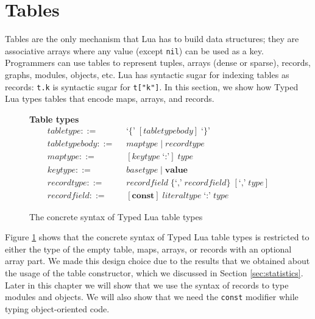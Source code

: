 \section{Tables}
\label{sec:tables}

Tables are the only mechanism that Lua has to build data structures;
they are associative arrays where any value (except \texttt{nil})
can be used as a key.
Programmers can use tables to represent tuples, arrays (dense or sparse),
records, graphs, modules, objects, etc.
Lua has syntactic sugar for indexing tables as records:
\texttt{t.k} is syntactic sugar for \texttt{t["k"]}.
In this section, we show how Typed Lua types tables that encode maps,
arrays, and records.

\begin{figure}[!ht]
\textbf{Table types}\\
\dstart
\begin{align*}
\textit{tabletype} ::= & \;\; \texttt{`\{'} \; [\textit{tabletypebody}] \; \texttt{`\}'}\\
\textit{tabletypebody} ::= & \;\; \textit{maptype} \; | \;
  \textit{recordtype}\\
\textit{maptype} ::= & \;\; [\textit{keytype} \; \texttt{`:'}] \; \textit{type}\\
\textit{keytype} ::= & \;\; \textit{basetype} \; | \;
  \textbf{value}\\
\textit{recordtype} ::= & \;\; \textit{recordfield} \; \{\texttt{`,'} \; \textit{recordfield}\} \; [\texttt{`,'} \; \textit{type}]\\
\textit{recordfield} ::= & \;\; [\textbf{const}] \; \textit{literaltype} \; \texttt{`:'} \; \textit{type}
\end{align*}
\dend
\caption{The concrete syntax of Typed Lua table types}
\label{fig:tables}
\end{figure}

Figure \ref{fig:tables} shows that the concrete syntax of Typed Lua
table types is restricted to either the type of the empty table,
maps, arrays, or records with an optional array part.
We made this design choice due to the results that we obtained
about the usage of the table constructor, which we discussed
in Section \ref{sec:statistics}.
Later in this chapter we will show that we use the syntax of records
to type modules and objects.
We will also show that we need the \texttt{const} modifier while
typing object-oriented code.

